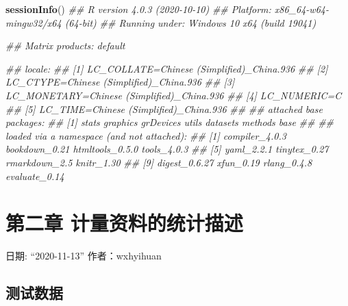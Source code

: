 \documentclass[
]{article}
\newenvironment{Shaded}{\begin{snugshade}}{\end{snugshade}}
\newcommand{\CommentTok}[1]{\textcolor[rgb]{0.56,0.35,0.01}{\textit{#1}}}
\newcommand{\KeywordTok}[1]{\textcolor[rgb]{0.13,0.29,0.53}{\textbf{#1}}}
\newcommand{\NormalTok}[1]{#1}
\begin{document}
\begin{Shaded}
\begin{Highlighting}[]
\KeywordTok{sessionInfo}\NormalTok{()}
\CommentTok{## R version 4.0.3 (2020-10-10)}
\CommentTok{## Platform: x86_64-w64-mingw32/x64 (64-bit)}
\CommentTok{## Running under: Windows 10 x64 (build 19041)}

\CommentTok{## Matrix products: default}

\CommentTok{## locale:}
\CommentTok{## [1] LC_COLLATE=Chinese (Simplified)_China.936 }
\CommentTok{## [2] LC_CTYPE=Chinese (Simplified)_China.936   }
\CommentTok{## [3] LC_MONETARY=Chinese (Simplified)_China.936}
\CommentTok{## [4] LC_NUMERIC=C                              }
\CommentTok{## [5] LC_TIME=Chinese (Simplified)_China.936    }
\CommentTok{## }
\CommentTok{## attached base packages:}
\CommentTok{## [1] stats     graphics  grDevices utils     datasets  methods   base     }
\CommentTok{## }
\CommentTok{## loaded via a namespace (and not attached):}
\CommentTok{##  [1] compiler_4.0.3  bookdown_0.21   htmltools_0.5.0 tools_4.0.3    }
\CommentTok{##  [5] yaml_2.2.1      tinytex_0.27    rmarkdown_2.5   knitr_1.30     }
\CommentTok{##  [9] digest_0.6.27   xfun_0.19       rlang_0.4.8     evaluate_0.14  }
\end{Highlighting}
\end{Shaded}

\hypertarget{ux7b2cux4e8cux7ae0-ux8ba1ux91cfux8d44ux6599ux7684ux7edfux8ba1ux63cfux8ff0}{%
\section{第二章 计量资料的统计描述}\label{ux7b2cux4e8cux7ae0-ux8ba1ux91cfux8d44ux6599ux7684ux7edfux8ba1ux63cfux8ff0}}

日期: ``2020-11-13''
作者：wxhyihuan

\hypertarget{ux6d4bux8bd5ux6570ux636e}{%
\subsection{测试数据}\label{ux6d4bux8bd5ux6570ux636e}}
\end{document}

